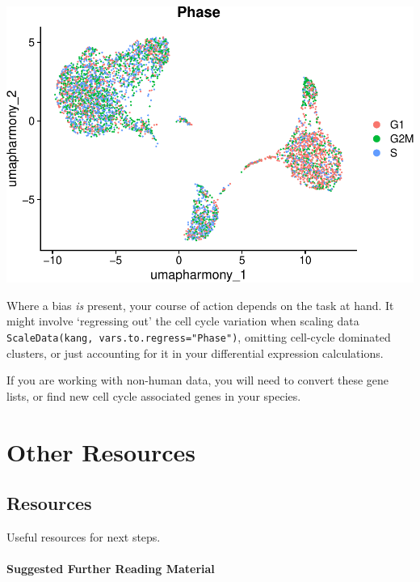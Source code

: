 \documentclass[
]{book}
\begin{document}
\includegraphics{scRNAseqInR_ABACBS_2024_Doco_files/figure-latex/unnamed-chunk-61-1.pdf}

Where a bias \emph{is} present, your course of action depends on the task at hand. It might involve `regressing out' the cell cycle variation when scaling data \texttt{ScaleData(kang,\ vars.to.regress="Phase")}, omitting cell-cycle dominated clusters, or just accounting for it in your differential expression calculations.

If you are working with non-human data, you will need to convert these gene lists, or find new cell cycle associated genes in your species.

\hypertarget{part-other-resources}{%
\part{Other Resources}\label{part-other-resources}}

\hypertarget{resources}{%
\chapter{Resources}\label{resources}}

Useful resources for next steps.

\hypertarget{suggested-further-reading-material}{%
\subsection{Suggested Further Reading Material}\label{suggested-further-reading-material}}
\end{document}
